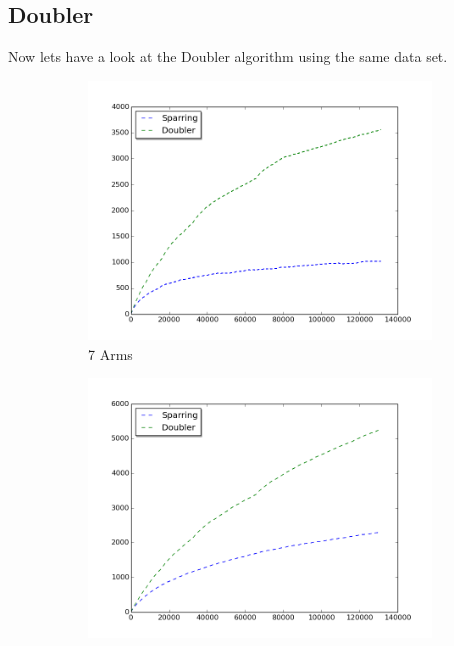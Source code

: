 \documentclass{llncs}
\begin{document}
\newpage
\subsection{Doubler}
Now lets have a look at the Doubler algorithm using the same data set.
\begin{figure}[h!]
\centering
\begin{subfigure}{.5\textwidth}
  \centering
  \includegraphics[scale=0.3, natwidth=410,natheight=442]{figures/doubler_sparring_MQ2007_7arms.png}
  \caption{7 Arms}
  \label{fig:sub1}
\end{subfigure}%
\begin{subfigure}{.5\textwidth}
  \centering
  \includegraphics[scale=0.3, natwidth=410,natheight=442]{figures/doubler_sparring_MQ2007_16arms.png}

\end{subfigure}
\end{figure}
\end{document}
